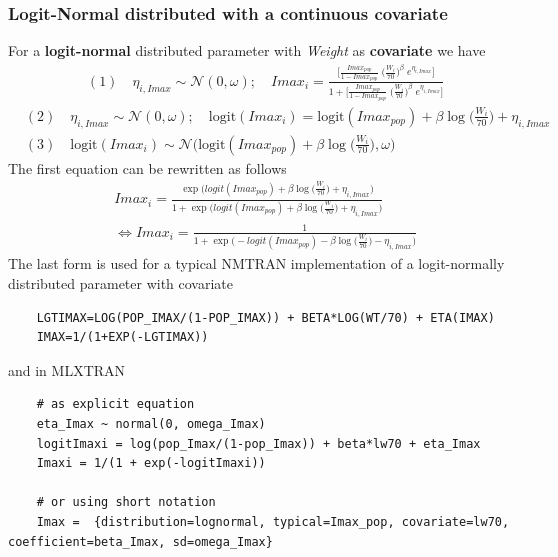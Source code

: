 \subsubsection{Logit-Normal distributed with a continuous covariate}
For a \textbf{logit-normal} distributed parameter with \textit{Weight} as \textbf{covariate} we have
\begin{align*}
&(1)\quad \eta_{i,Imax} \sim \mathcal{N}(0,\omega); \quad Imax_i= \frac{\bigg[\frac{Imax_{pop}}{1-Imax_{pop}} \; \big(\frac{W_i}{70}\big)^\beta \; e^{\eta_{i,Imax}} \bigg]}{ 1+  \bigg[\frac{Imax_{pop}}{1-Imax_{pop}} \; \big(\frac{W_i}{70}\big)^\beta \; e^{\eta_{i,Imax}} \bigg]}
\end{align*}
\begin{align*}
&(2)\quad \eta_{i,Imax} \sim \mathcal{N}(0,\omega); \quad \mbox{logit}( Imax_i ) = \mbox{logit}( Imax_{pop} ) + \beta \log\bigg(\frac{W_i}{70}\bigg) + \eta_{i,Imax}  \\
&(3)\quad \mbox{logit}(  Imax_i ) \sim \mathcal{N}\big( \mbox{logit}( Imax_{pop}) + \beta\log\Big(\frac{W_i}{70}\Big),\omega\big)
\end{align*}
The first equation can be rewritten as follows
\begin{align*}
& Imax_i= \frac{\exp\big(logit(Imax_{pop}) + \beta \log\big(\frac{W_i}{70}\big) + \eta_{i,Imax} \big)}{ 1+ \exp\big(logit(Imax_{pop}) + \beta \log\big(\frac{W_i}{70}\big) + \eta_{i,Imax} \big)}  \\
& \Leftrightarrow Imax_i= \frac{1}{ 1+ \exp\big(- logit(Imax_{pop}) - \beta \log\big(\frac{W_i}{70}\big) - \eta_{i,Imax} \big)}
\end{align*}\newline
The last form is used for a typical NMTRAN implementation of a logit-normally distributed parameter with covariate
\begin{lstlisting}
	LGTIMAX=LOG(POP_IMAX/(1-POP_IMAX)) + BETA*LOG(WT/70) + ETA(IMAX)
	IMAX=1/(1+EXP(-LGTIMAX))
\end{lstlisting}
and in MLXTRAN
\begin{lstlisting}
	# as explicit equation
	eta_Imax ~ normal(0, omega_Imax)
	logitImaxi = log(pop_Imax/(1-pop_Imax)) + beta*lw70 + eta_Imax
	Imaxi = 1/(1 + exp(-logitImaxi))

	# or using short notation
	Imax =	{distribution=lognormal, typical=Imax_pop, covariate=lw70, coefficient=beta_Imax, sd=omega_Imax}
\end{lstlisting}


